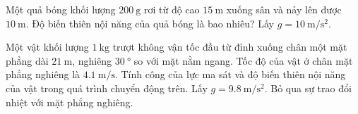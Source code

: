 \begin{ex}
	Một quả bóng khối lượng $\SI{200}{\gram}$ rơi từ độ cao $\SI{15}{\meter}$ xuống sân và nảy lên được $\SI{10}{\meter}$. Độ biến thiên nội năng của quả bóng là bao nhiêu? Lấy $g=\SI{10}{\meter/\second^2}$.
\end{ex}

\begin{ex}
	Một vật khối lượng $\SI{1}{\kilogram}$ trượt không vận tốc đầu từ đỉnh xuống chân một mặt phẳng dài $\SI{21}{\meter}$, nghiêng $\SI{30}{\degree}$ so với mặt nằm ngang. Tốc độ của vật ở chân mặt phẳng nghiêng là $\SI{4.1}{\meter/\second}$. Tính công của lực ma sát và độ biến thiên nội năng của vật trong quá trình chuyển động trên. Lấy $g=\SI{9.8}{\meter/\second^2}$. Bỏ qua sự trao đổi nhiệt với mặt phẳng nghiêng.
\end{ex}
